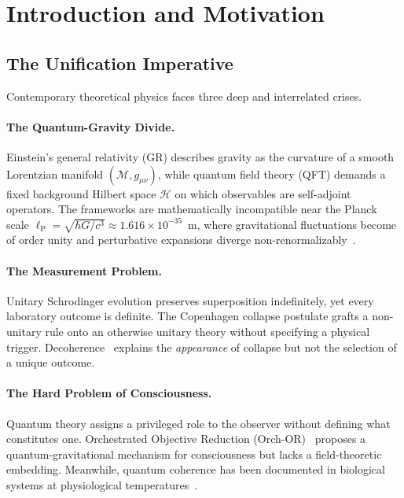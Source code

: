 \documentclass[12pt,a4paper]{article}
\theoremstyle{myrmk}
\newcommand{\lP}{\ell_{\mathrm{P}}}
\begin{document}
\tableofcontents\newpage
{}

\section{Introduction and Motivation}
\label{sec:intro}

\subsection{The Unification Imperative}

Contemporary theoretical physics faces three deep and interrelated crises.

\paragraph{The Quantum-Gravity Divide.}
Einstein's general relativity (GR) describes gravity as the curvature of a smooth
Lorentzian manifold $(\mathcal{M},g_{\mu\nu})$, while quantum field theory (QFT)
demands a fixed background Hilbert space $\mathcal{H}$ on which observables are
self-adjoint operators. The frameworks are mathematically incompatible near the
Planck scale $\lP = \sqrt{\hbar G/c^3}\approx 1.616\times10^{-35}$~m, where
gravitational fluctuations become of order unity and perturbative expansions diverge
non-renormalizably~\cite{Donoghue1994}.

\paragraph{The Measurement Problem.}
Unitary Schrodinger evolution preserves superposition indefinitely, yet every
laboratory outcome is definite. The Copenhagen collapse postulate grafts a
non-unitary rule onto an otherwise unitary theory without specifying a physical
trigger. Decoherence~\cite{Zurek2003} explains the \emph{appearance} of collapse but
not the selection of a unique outcome.

\paragraph{The Hard Problem of Consciousness.}
Quantum theory assigns a privileged role to the observer without defining what
constitutes one. Orchestrated Objective Reduction (Orch-OR)~\cite{Penrose1994,Hameroff2014}
proposes a quantum-gravitational mechanism for consciousness but lacks a
field-theoretic embedding. Meanwhile, quantum coherence has been documented in
biological systems at physiological temperatures~\cite{Engel2007,Lambert2013}.
\end{document}
